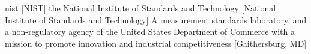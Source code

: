 \newglsXinstitution%
{nist}%
[NIST]%
{the National Institute of Standards and Technology}%
[National Institute of Standards and Technology]%
{A measurement standards laboratory, and a non-regulatory agency of the United States Department of Commerce with a mission to promote innovation and industrial competitiveness \cite{website:National_Institute_of_Standards_and_Technology}}%
[Gaithersburg, MD]%